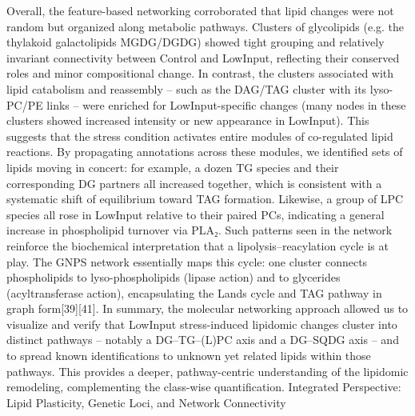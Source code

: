\documentclass[10pt,letterpaper]{article}
\begin{document}
\begin{itemize}
Overall, the feature-based networking corroborated that lipid changes were not random but organized along metabolic pathways. Clusters of glycolipids (e.g. the thylakoid galactolipids MGDG/DGDG) showed tight grouping and relatively invariant connectivity between Control and LowInput, reflecting their conserved roles and minor compositional change. In contrast, the clusters associated with lipid catabolism and reassembly – such as the DAG/TAG cluster with its lyso-PC/PE links – were enriched for LowInput-specific changes (many nodes in these clusters showed increased intensity or new appearance in LowInput). This suggests that the stress condition activates entire modules of co-regulated lipid reactions. By propagating annotations across these modules, we identified sets of lipids moving in concert: for example, a dozen TG species and their corresponding DG partners all increased together, which is consistent with a systematic shift of equilibrium toward TAG formation. Likewise, a group of LPC species all rose in LowInput relative to their paired PCs, indicating a general increase in phospholipid turnover via PLA₂. Such patterns seen in the network reinforce the biochemical interpretation that a lipolysis–reacylation cycle is at play. The GNPS network essentially maps this cycle: one cluster connects phospholipids to lyso-phospholipids (lipase action) and to glycerides (acyltransferase action), encapsulating the Lands cycle and TAG pathway in graph form[39][41]. In summary, the molecular networking approach allowed us to visualize and verify that LowInput stress-induced lipidomic changes cluster into distinct pathways – notably a DG–TG–(L)PC axis and a DG–SQDG axis – and to spread known identifications to unknown yet related lipids within those pathways. This provides a deeper, pathway-centric understanding of the lipidomic remodeling, complementing the class-wise quantification.
Integrated Perspective: Lipid Plasticity, Genetic Loci, and Network Connectivity

\end{itemize}
\end{document}
